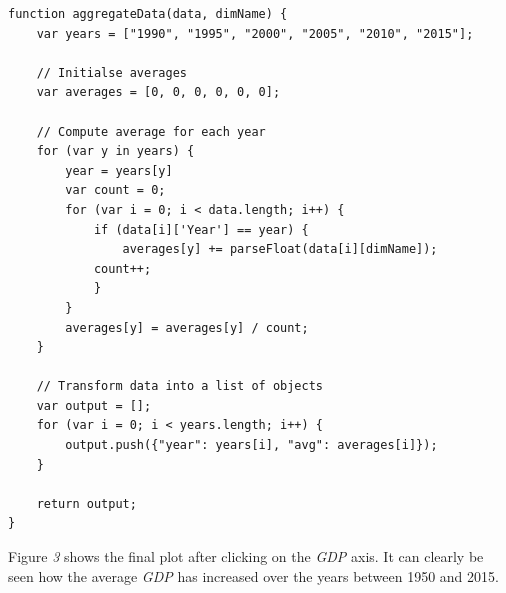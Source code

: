 \documentclass[]{article}
\begin{document}
\begin{lstlisting}[caption=aggregateData Function]
function aggregateData(data, dimName) {
	var years = ["1990", "1995", "2000", "2005", "2010", "2015"];
	
	// Initialse averages
	var averages = [0, 0, 0, 0, 0, 0];
	
	// Compute average for each year
	for (var y in years) {
		year = years[y]
		var count = 0;
		for (var i = 0; i < data.length; i++) {
			if (data[i]['Year'] == year) {
				averages[y] += parseFloat(data[i][dimName]);
			count++;
			}
		}
		averages[y] = averages[y] / count;
	}
	
	// Transform data into a list of objects
	var output = [];
	for (var i = 0; i < years.length; i++) {
		output.push({"year": years[i], "avg": averages[i]});
	}
	
	return output;
}
\end{lstlisting}
Figure \emph{3} shows the final plot after clicking on the \emph{GDP} axis. It can clearly be seen how the average \emph{GDP} has increased over the years between 1950 and 2015. 
\end{document}
